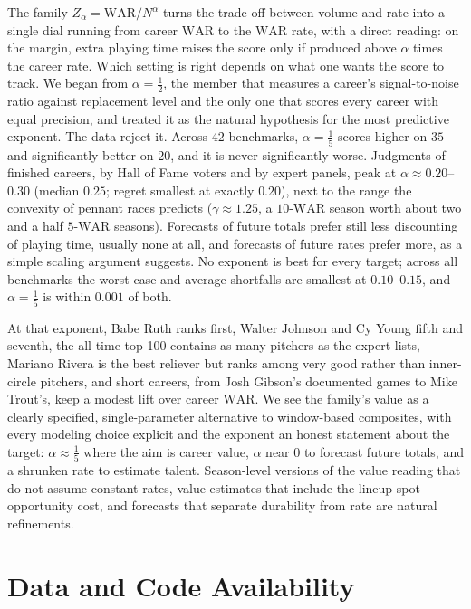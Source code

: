 \documentclass[11pt,letterpaper]{article}
\theoremstyle{plain}
\theoremstyle{definition}
\theoremstyle{remark}
\newcommand{\WAR}{\mathrm{WAR}}
\begin{document}
The family $Z_\alpha = \WAR/N^{\alpha}$ turns the trade-off between volume and rate into a single dial running from career $\WAR$ to the $\WAR$ rate, with a direct reading: on the margin, extra playing time raises the score only if produced above $\alpha$ times the career rate. Which setting is right depends on what one wants the score to track. We began from $\alpha = \tfrac12$, the member that measures a career's signal-to-noise ratio against replacement level and the only one that scores every career with equal precision, and treated it as the natural hypothesis for the most predictive exponent. The data reject it. Across $42$ benchmarks, $\alpha = \tfrac15$ scores higher on $35$ and significantly better on $20$, and it is never significantly worse. Judgments of finished careers, by Hall of Fame voters and by expert panels, peak at $\alpha \approx 0.20$--$0.30$ (median $0.25$; regret smallest at exactly $0.20$), next to the range the convexity of pennant races predicts ($\gamma \approx 1.25$, a $10$-$\WAR$ season worth about two and a half $5$-$\WAR$ seasons). Forecasts of future totals prefer still less discounting of playing time, usually none at all, and forecasts of future rates prefer more, as a simple scaling argument suggests. No exponent is best for every target; across all benchmarks the worst-case and average shortfalls are smallest at $0.10$--$0.15$, and $\alpha = \tfrac15$ is within $0.001$ of both.

At that exponent, Babe Ruth ranks first, Walter Johnson and Cy Young fifth and seventh, the all-time top 100 contains as many pitchers as the expert lists, Mariano Rivera is the best reliever but ranks among very good rather than inner-circle pitchers, and short careers, from Josh Gibson's documented games to Mike Trout's, keep a modest lift over career $\WAR$. We see the family's value as a clearly specified, single-parameter alternative to window-based composites, with every modeling choice explicit and the exponent an honest statement about the target: $\alpha \approx \tfrac15$ where the aim is career value, $\alpha$ near $0$ to forecast future totals, and a shrunken rate to estimate talent. Season-level versions of the value reading that do not assume constant rates, value estimates that include the lineup-spot opportunity cost, and forecasts that separate durability from rate are natural refinements.

\section*{Data and Code Availability}
\end{document}

